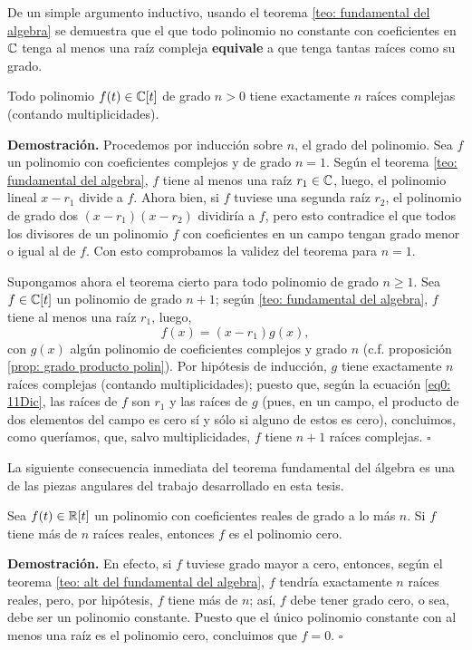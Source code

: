 De un simple argumento inductivo, usando el teorema 
\ref{teo: fundamental del algebra} se demuestra que 
el que 
todo polinomio no constante con coeficientes en $\mathbb{C}$
tenga al menos una raíz compleja \textbf{equivale} a que
tenga tantas raíces como su grado.

\begin{teo}
\label{teo: alt del fundamental del algebra}
Todo polinomio $f(t) \in \mathbb{C}[t]$ 
de grado $n>0$
tiene exactamente $n$ raíces complejas
(contando multiplicidades).
\end{teo}
\noindent
\textbf{Demostración.}
Procedemos por inducción sobre $n$, el grado del polinomio.
Sea $f$ un polinomio con coeficientes
complejos y de grado $n=1$. Según el teorema 
\ref{teo: fundamental del algebra}, $f$ tiene al menos
una raíz $r_{1} \in \mathbb{C}$, luego,
el polinomio lineal $x-r_{1}$
divide a $f$. Ahora bien, si $f$ tuviese una segunda
raíz $r_{2}$, el polinomio 
de grado dos $(x-r_{1})(x-r_{2})$
dividiría a $f$, pero esto contradice el que 
todos los divisores de un polinomio $f$ con coeficientes
en un campo tengan grado menor o igual al de $f$. 
Con esto comprobamos la validez del teorema para $n=1$.

Supongamos ahora el teorema cierto para 
todo polinomio de grado
$n \geq 1$.
Sea $f \in \mathbb{C}[t]$ un polinomio de grado $n+1$; según 
\ref{teo: fundamental del algebra}, $f$ tiene al menos
una raíz $r_{1}$, luego,
\begin{equation}
\label{eq0: 11Dic}
f(x)= (x-r_{1}) g(x), 
\end{equation}
con $g(x)$ algún polinomio de coeficientes complejos y grado
$n$ (c.f. proposición \ref{prop: grado producto polin}). 
Por hipótesis de inducción, $g$ tiene exactamente
$n$ raíces complejas (contando multiplicidades); puesto que,
según la ecuación \eqref{eq0: 11Dic}, las raíces de $f$
son $r_{1}$ y las raíces de $g$ (pues, en un campo, el producto
de dos elementos del campo es cero sí y sólo si alguno de 
estos es cero), concluimos, como queríamos, que, salvo
multiplicidades, $f$ tiene $n+1$ raíces complejas.
\null\nobreak\hfill\ensuremath{\square} 
\vspace{0.2cm}

La siguiente consecuencia inmediata del teorema fundamental del
álgebra es 
una de las piezas angulares del trabajo desarrollado en esta tesis.

\begin{prop}
\label{prop: cita TFA}
Sea $f(t) \in \mathbb{R}[t]$ un polinomio con coeficientes reales
de grado a lo más $n$. Si $f$ tiene más de $n$ raíces reales, entonces
$f$ es el polinomio cero.
\end{prop}
\noindent
\textbf{Demostración.}
En efecto, si $f$ tuviese grado mayor a cero, entonces, 
según el teorema \ref{teo: alt del fundamental del algebra},
$f$ tendría exactamente $n$ raíces reales,
pero, por hipótesis, $f$ tiene más de $n$; así, $f$
debe tener grado cero, o sea, debe  ser un polinomio constante.
Puesto que el único polinomio constante con al menos una raíz
es el polinomio cero, concluimos que $f=0$.
\null\nobreak\hfill\ensuremath{\square} %
\vspace{0.2cm}
